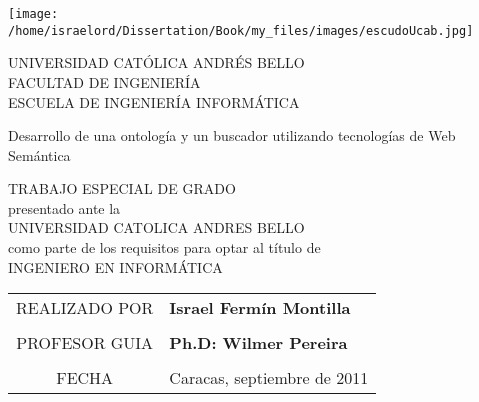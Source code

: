 \begin{center}
\parbox{4cm}{\texttt{[image: /home/israelord/Dissertation/Book/my\_files/images/escudoUcab.jpg]}}\parbox{9cm}{\begin{center}
UNIVERSIDAD CATÓLICA ANDRÉS BELLO \\
FACULTAD DE INGENIERÍA \\
ESCUELA DE INGENIERÍA INFORMÁTICA \\
\end{center}}

\vspace{\fill}


\begin{LARGE}
Desarrollo de una ontología y un buscador utilizando tecnologías de Web Semántica
\end{LARGE}

\vspace{\fill}

TRABAJO ESPECIAL DE GRADO\\
presentado ante la\\
UNIVERSIDAD CATOLICA ANDRES BELLO\\
como parte de los requisitos para optar al t\'itulo de\\
INGENIERO EN INFORM\'ATICA

\vspace{\fill}

{
\begin{tabular}{cl}
REALIZADO POR & \textbf{Israel Fermín Montilla}\tabularnewline
\multicolumn{2}{c}{}\tabularnewline
PROFESOR GUIA & \textbf{Ph.D: Wilmer Pereira}\tabularnewline
\multicolumn{2}{c}{}\tabularnewline
FECHA & Caracas, septiembre de 2011\tabularnewline
\end{tabular}
}


\end{center}

